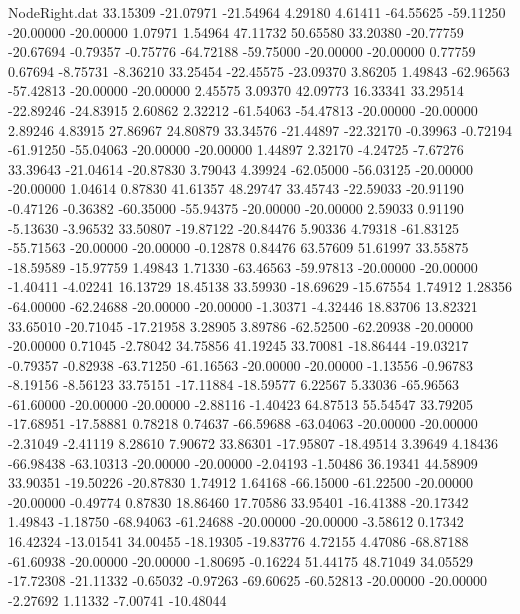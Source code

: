 \begin{filecontents}{NodeRight.dat}
  33.15309  -21.07971  -21.54964     4.29180    4.61411  -64.55625  -59.11250  -20.00000  -20.00000    1.07971    1.54964   47.11732   50.65580
  33.20380  -20.77759  -20.67694    -0.79357   -0.75776  -64.72188  -59.75000  -20.00000  -20.00000    0.77759    0.67694   -8.75731   -8.36210
  33.25454  -22.45575  -23.09370     3.86205    1.49843  -62.96563  -57.42813  -20.00000  -20.00000    2.45575    3.09370   42.09773   16.33341
  33.29514  -22.89246  -24.83915     2.60862    2.32212  -61.54063  -54.47813  -20.00000  -20.00000    2.89246    4.83915   27.86967   24.80879
  33.34576  -21.44897  -22.32170    -0.39963   -0.72194  -61.91250  -55.04063  -20.00000  -20.00000    1.44897    2.32170   -4.24725   -7.67276
  33.39643  -21.04614  -20.87830     3.79043    4.39924  -62.05000  -56.03125  -20.00000  -20.00000    1.04614    0.87830   41.61357   48.29747
  33.45743  -22.59033  -20.91190    -0.47126   -0.36382  -60.35000  -55.94375  -20.00000  -20.00000    2.59033    0.91190   -5.13630   -3.96532
  33.50807  -19.87122  -20.84476     5.90336    4.79318  -61.83125  -55.71563  -20.00000  -20.00000   -0.12878    0.84476   63.57609   51.61997
  33.55875  -18.59589  -15.97759     1.49843    1.71330  -63.46563  -59.97813  -20.00000  -20.00000   -1.40411   -4.02241   16.13729   18.45138
  33.59930  -18.69629  -15.67554     1.74912    1.28356  -64.00000  -62.24688  -20.00000  -20.00000   -1.30371   -4.32446   18.83706   13.82321
  33.65010  -20.71045  -17.21958     3.28905    3.89786  -62.52500  -62.20938  -20.00000  -20.00000    0.71045   -2.78042   34.75856   41.19245
  33.70081  -18.86444  -19.03217    -0.79357   -0.82938  -63.71250  -61.16563  -20.00000  -20.00000   -1.13556   -0.96783   -8.19156   -8.56123
  33.75151  -17.11884  -18.59577     6.22567    5.33036  -65.96563  -61.60000  -20.00000  -20.00000   -2.88116   -1.40423   64.87513   55.54547
  33.79205  -17.68951  -17.58881     0.78218    0.74637  -66.59688  -63.04063  -20.00000  -20.00000   -2.31049   -2.41119    8.28610    7.90672
  33.86301  -17.95807  -18.49514     3.39649    4.18436  -66.98438  -63.10313  -20.00000  -20.00000   -2.04193   -1.50486   36.19341   44.58909
  33.90351  -19.50226  -20.87830     1.74912    1.64168  -66.15000  -61.22500  -20.00000  -20.00000   -0.49774    0.87830   18.86460   17.70586
  33.95401  -16.41388  -20.17342     1.49843   -1.18750  -68.94063  -61.24688  -20.00000  -20.00000   -3.58612    0.17342   16.42324  -13.01541
  34.00455  -18.19305  -19.83776     4.72155    4.47086  -68.87188  -61.60938  -20.00000  -20.00000   -1.80695   -0.16224   51.44175   48.71049
  34.05529  -17.72308  -21.11332    -0.65032   -0.97263  -69.60625  -60.52813  -20.00000  -20.00000   -2.27692    1.11332   -7.00741  -10.48044

\end{filecontents}
